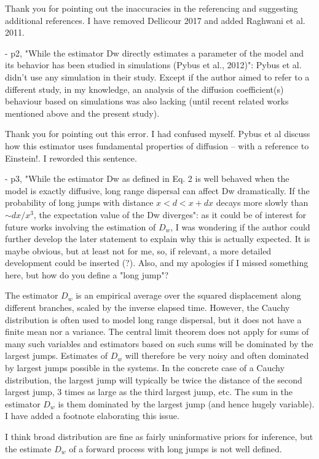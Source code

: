 \documentclass[11pt, oneside]{article}   	%
\newcommand{\response}[1]{{\color{black}{\bf Response:} #1}}
\begin{document}
\response{Thank you for pointing out the inaccuracies in the referencing and suggesting additional references. I have removed Dellicour 2017 and added Raghwani et al. 2011.}


- p2, "While the estimator Dw directly estimates a parameter of the model and its behavior has been studied in simulations (Pybus et al., 2012)": Pybus et al. didn't use any simulation in their study. Except if the author aimed to refer to a different study, in my knowledge, an analysis of the diffusion coefficient(s) behaviour based on simulations was also lacking (until recent related works mentioned above and the present study).

\response{Thank you for pointing out this error. I had confused myself. Pybus et al discuss how this estimator uses fundamental properties of diffusion -- with a reference to Einstein!. I reworded this sentence.}


- p3, "While the estimator Dw as defined in Eq. 2 is well behaved when the model is exactly diffusive, long range dispersal can affect Dw dramatically. If the probability of long jumps with distance $x < d < x+dx$ decays more slowly than $\sim dx/x^3$, the expectation value of the Dw diverges": as it could be of interest for future works involving the estimation of $D_w$, I was wondering if the author could further develop the later statement to explain why this is actually expected. It is maybe obvious, but at least not for me, so, if relevant, a more detailed development could be inserted (?). Also, and my apologies if I missed something here, but how do you define a "long jump"?

\response{
The estimator $D_w$ is an empirical average over the squared displacement along different branches, scaled by the inverse elapsed time.
However, the Cauchy distribution is often used to model long range dispersal, but it does not have a finite mean nor a variance. The central limit theorem does not apply for sums of many such variables and estimators based on such sums will be dominated by the largest jumps. Estimates of $D_w$ will therefore be very noisy and often dominated by largest jumps possible in the systems.
In the concrete case of a Cauchy distribution, the largest jump will typically be twice the distance of the second largest jump, 3 times as large as the third largest jump, etc. The sum in the estimator $D_w$ is them dominated by the largest jump (and hence hugely variable).
I have added a footnote elaborating this issue.

I think broad distribution are fine as fairly uninformative priors for inference, but the estimate $D_w$ of a forward process with long jumps is not well defined.

}
\end{document}
